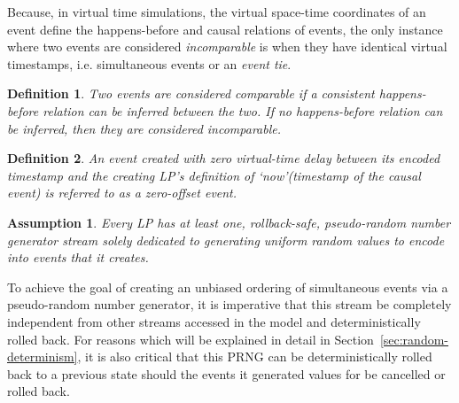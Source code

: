 \documentclass[nonacm,sigconf]{acmart}
\newcommand{\now}{\lq now\rq\xspace}
\newtheorem{definition}{Definition}
\newtheorem{assumption}{Assumption}
\begin{document}

Because, in virtual time simulations, the virtual space-time coordinates of an event define the happens-before and causal relations of events, the only instance where two events are considered \emph{incomparable} is when they have identical virtual timestamps, i.e. simultaneous events or an \emph{event tie}. 

\begin{definition}\label{def:comparable}
  Two events are considered comparable if a consistent happens-before relation can be inferred between the two. If no happens-before relation can be inferred, then they are considered incomparable.
\end{definition}

\begin{definition}\label{def:zero-offset}
 An event created with zero virtual-time delay between its encoded timestamp and the creating LP's definition of \now (timestamp of the causal event) is referred to as a zero-offset event.
\end{definition}

\begin{assumption}\label{as:rng}
  Every LP has at least one, rollback-safe, pseudo-random number generator stream solely dedicated to generating uniform random values to encode into events that it creates.
\end{assumption}

To achieve the goal of creating an unbiased ordering of simultaneous events via a pseudo-random number generator, it is imperative that this stream be completely independent from other streams accessed in the model and deterministically rolled back. For reasons which will be explained in detail in Section~\ref{sec:random-determinism}, it is also critical that this PRNG can be deterministically rolled back to a previous state should the events it generated values for be cancelled or rolled back.
\end{document}
